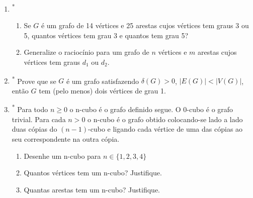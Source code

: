 \begin{enumerate}[label=\textbf{\arabic*.}, ref=\arabic*]
    \item\textsuperscript{*} 
    \begin{enumerate}
        \item Se $G$ é um grafo de 14 vértices e 25 arestas cujos vértices tem graus 3 ou 5, quantos vértices tem grau 3 e quantos tem grau 5? 
        \item Generalize o raciocínio para um grafo de $n$ vértices e $m$ arestas cujos vértices tem graus $d_{1}$ ou $d_{2}$. 
    \end{enumerate}
    
    \item\textsuperscript{*} Prove que se $G$ é um grafo satisfazendo $\delta(G)>0$, $|E(G)|<|V(G)|$, então $G$ tem (pelo menos) dois vértices de grau 1. 
    
    \item\textsuperscript{*} Para todo $n\ge0$ o n-cubo é o grafo definido segue. O 0-cubo é o grafo trivial. Para cada $n>0$ o n-cubo é o grafo obtido colocando-se lado a lado duas cópias do $(n-1)$-cubo e ligando cada vértice de uma das cópias ao seu correspondente na outra cópia. 
    \begin{enumerate}
        \item Desenhe um n-cubo para $n\in\{1,2,3,4\}$ 
        \item Quantos vértices tem um n-cubo? Justifique. 
        \item Quantas arestas tem um n-cubo? Justifique. 
    \end{enumerate}
\end{enumerate}